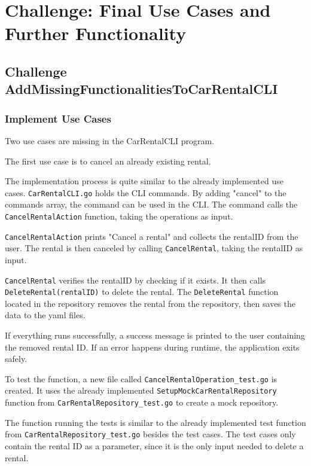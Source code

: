 \section{Challenge: Final Use Cases and Further Functionality}
\label{sec:challenge_final_use_cases_and_further_functionality}

\subsection{Challenge AddMissingFunctionalitiesToCarRentalCLI}
\label{subsec:challenge_addmissingfunctionalitiestocarrentalcli}

\subsubsection*{Implement Use Cases}
Two use cases are missing in the CarRentalCLI program.

The first use case is to cancel an already existing rental.

The implementation process is quite similar to the already implemented use cases.
\texttt{CarRentalCLI.go} holds the CLI commands.
By adding "cancel" to the commands array, the command can be used in the CLI.
The command calls the \texttt{CancelRentalAction} function, taking the operations as input.

\texttt{CancelRentalAction} prints "Cancel a rental" and collects the rentalID from the user.
The rental is then canceled by calling \texttt{CancelRental}, taking the rentalID as input.

\texttt{CancelRental} verifies the rentalID by checking if it exists. \hfill \linebreak
It then calls \texttt{DeleteRental(rentalID)} to delete the rental.
The \texttt{DeleteRental} function located in the repository removes the rental from the repository, then saves the data to the yaml files.

If everything runs successfully, a success message is printed to the user containing the removed rental ID.
If an error happens during runtime, the application exits safely.

To test the function, a new file called \texttt{CancelRentalOperation\_test.go} is created.
It uses the already implemented \texttt{SetupMockCarRentalRepository} function from \hfill \linebreak \texttt{CarRentalRepository\_test.go} to create a mock repository.

The function running the tests is similar to the already implemented test function from \texttt{CarRentalRepository\_test.go} besides the test cases.
The test cases only contain the rental ID as a parameter, since it is the only input needed to delete a rental.

